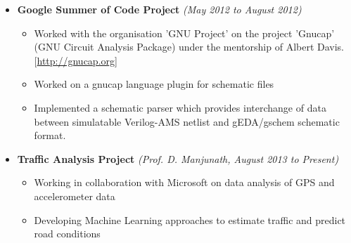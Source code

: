 \documentclass[a4paper,11pt]{article}
\newcommand{\isep}{-2 pt}
\begin{document}
\begin{itemize}
    \item \textbf {Google Summer of Code Project} \hfill  \emph{(May 2012 to August 2012)} \\[-0.6cm]
    \begin{itemize}
        \item Worked with the organisation 'GNU Project' on the project 'Gnucap' (GNU Circuit Analysis Package) under the mentorship of Albert Davis. \hfill  [\url{http://gnucap.org}]
        \item Worked on a gnucap language plugin for schematic files
        \item Implemented a schematic parser which provides interchange of data between simulatable Verilog-AMS netlist and gEDA/gschem schematic format.
    \end{itemize}

\item \textbf{Traffic Analysis Project} \hfill \emph{(Prof. D. Manjunath, August 2013 to Present)} \\[-0.6cm]
        \begin{itemize}
            \item Working in collaboration with Microsoft on data analysis of GPS and accelerometer data
            \item Developing Machine Learning approaches to estimate traffic and predict road conditions
        \end{itemize}


\end{itemize}
\end{document}
